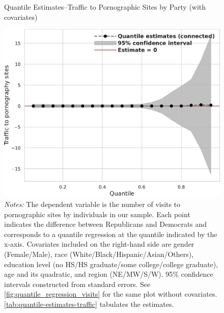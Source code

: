\documentclass[12pt,twoside]{article}
\begin{document}
\begin{figure}
	\centering
	\caption{Quantile Estimates--Traffic to Pornographic Sites by Party (with covariates)}
	\includegraphics[width=.55\linewidth]{figs/quantile_reg_covariates_visits_adult.pdf}
	\caption*{\footnotesize \emph{Notes:} 
		The dependent variable is the number of visits to pornographic sites by individuals in our sample.
		Each point indicates the difference between Republicans and Democrats and corresponds to a quantile regression at the quantile indicated by the x-axis.
		Covariates included on the right-hand side are gender (Female/Male), race (White/Black/Hispanic/Asian/Others), education level (no HS/HS graduate/some college/college graduate), age and its quadratic, and region (NE/MW/S/W).
		95\% confidence intervals constructed from standard errors.
		See \cref{fig:quantile_regression_visits} for the same plot without covariates.
            \cref{tab:quantile-estimates-traffic} tabulates the estimates.
	}
	\label{fig:quantile_regression_visits_covariates}
\end{figure}
\end{document}
